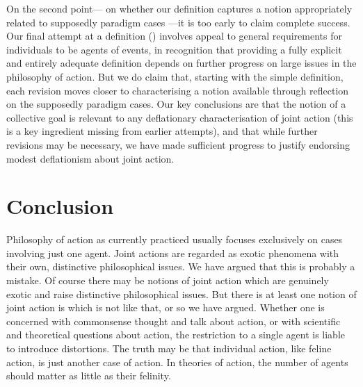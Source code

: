 \documentclass[12pt,a4paper]{extarticle}
\begin{document}
On the second point---%
on whether our definition captures a notion appropriately related to supposedly paradigm cases%
---it is too early to claim complete success.
Our final attempt at a definition () involves appeal to general requirements for individuals to be agents of events, in recognition that providing a fully explicit and entirely adequate definition depends on further progress on large issues in the philosophy of action.
But we do claim that, starting with the simple definition, each revision moves closer to characterising a notion available through reflection on the supposedly paradigm cases.
Our key conclusions are
	that
	the notion of a collective goal is relevant to any deflationary characterisation of joint action (this is a key ingredient missing from earlier attempts),
	and that
	 while further revisions may be necessary, we have made sufficient progress to justify endorsing modest deflationism about joint action.

\label{end_section_from_collective_goals}


\section{Conclusion}
	\label{section_conclusion}
	
Philosophy of action as currently practiced usually focuses exclusively on cases involving just one agent.
Joint actions are regarded as exotic phenomena with their own, distinctive philosophical issues.
We have argued that this is probably a mistake. 
Of course there may be notions of joint action which are genuinely exotic and raise distinctive philosophical issues.
But there is at least one notion of joint action is which is not like that, or so we have argued.
Whether one is concerned with commonsense thought and talk about action,
or with scientific and theoretical questions about action,
the restriction to a single agent is liable to introduce distortions.
The truth may be that individual action, like feline action, is just another case of action.
In theories of action, the number of agents should matter as little as their felinity.
\end{document}
